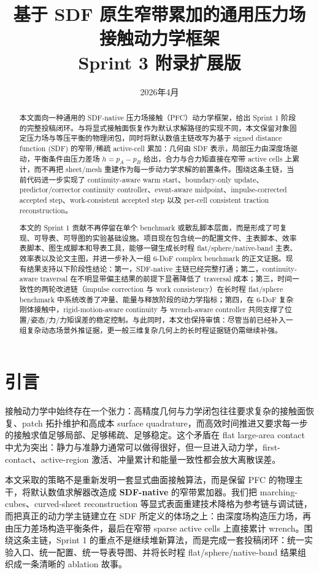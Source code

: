 \documentclass[11pt,a4paper]{ctexart}
\title{基于 SDF 原生窄带累加的通用压力场接触动力学框架\\Sprint 3 附录扩展版}
\author{}
\date{2026年4月}
\begin{document}
\maketitle

\begin{abstract}
本文面向一种通用的 SDF-native 压力场接触（PFC）动力学框架，给出 Sprint 1 阶段的完整投稿闭环。与将显式接触面恢复作为默认求解路径的实现不同，本文保留对象固定压力场与等压平衡的物理闭包，同时将默认数值主链改写为基于 signed distance function (SDF) 的窄带/稀疏 active-cell 累加：几何由 SDF 表示，局部压力由深度场驱动，平衡条件由压力差场 $h=p_A-p_B$ 给出，合力与合力矩直接在窄带 active cells 上累计，而不再把 sheet/mesh 重建作为每一步动力学求解的前置条件。围绕这条主链，当前代码进一步实现了 continuity-aware warm start、boundary-only update、predictor/corrector continuity controller、event-aware midpoint、impulse-corrected accepted step、work-consistent accepted step 以及 per-cell consistent traction reconstruction。

本文的 Sprint 1 贡献不再停留在单个 benchmark 或散乱脚本层面，而是形成了可复现、可导表、可导图的实验基础设施。项目现在包含统一的配置文件、主表脚本、效率表脚本、图生成脚本和导表工具，能够一键生成长时程 flat/sphere/native-band 主表、效率表以及论文主图，并进一步补入一组 6-DoF complex benchmark 的正文证据。现有结果支持以下阶段性结论：第一，SDF-native 主链已经完整打通；第二，continuity-aware traversal 在不明显带偏主结果的前提下显著降低了 traversal 成本；第三，时间一致性的两轮改进链（impulse correction 与 work consistency）在长时程 flat/sphere benchmark 中系统改善了冲量、能量与释放阶段的动力学指标；第四，在 6-DoF 复杂刚体接触中，rigid-motion-aware continuity 与 wrench-aware controller 共同支撑了位置/姿态/力/力矩误差的稳定控制。与此同时，本文也保持审慎：尽管当前已经补入一组复杂动态场景外推证据，更一般三维复杂几何上的长时程证据链仍需继续补强。
\end{abstract}

\tableofcontents

\section{引言}
接触动力学中始终存在一个张力：高精度几何与力学闭包往往要求复杂的接触面恢复、patch 拓扑维护和高成本 surface quadrature，而高效时间推进又要求每一步的接触求值足够局部、足够稀疏、足够稳定。这个矛盾在 flat large-area contact 中尤为突出：静力与准静力通常可以做得很好，但一旦进入动力学，first-contact、active-region 激活、冲量累计和能量一致性都会放大离散误差。

本文采取的策略不是重新发明一套显式曲面接触算法，而是保留 PFC 的物理主干，将默认数值求解器改造成 \textbf{SDF-native} 的窄带累加器。我们把 marching-cubes、curved-sheet reconstruction 等显式表面重建技术降格为参考链与调试链，而把真正的动力学主链建立在 SDF 所定义的体场之上：由深度场构造压力场，再由压力差场构造平衡条件，最后在窄带 sparse active cells 上直接累计 wrench。围绕这条主链，Sprint 1 的重点不是继续堆新算法，而是完成一套投稿闭环：统一实验入口、统一配置、统一导表导图、并将长时程 flat/sphere/native-band 结果组织成一条清晰的 ablation 故事。
\end{document}
